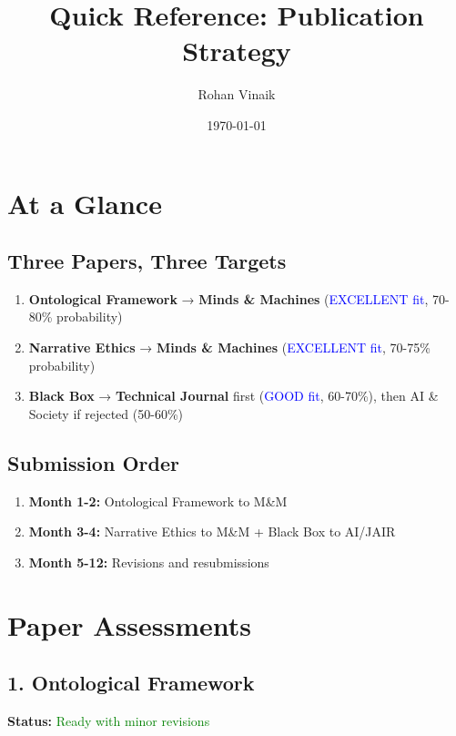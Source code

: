 \documentclass[12pt]{article}
\title{\textbf{Quick Reference: Publication Strategy}}
\author{Rohan Vinaik}
\date{\today}
\begin{document}
\maketitle

\section*{At a Glance}

\subsection*{Three Papers, Three Targets}

\begin{enumerate}[itemsep=0pt]
\item \textbf{Ontological Framework} → \textbf{Minds \& Machines} (\textcolor{blue}{EXCELLENT fit}, 70-80\% probability)
\item \textbf{Narrative Ethics} → \textbf{Minds \& Machines} (\textcolor{blue}{EXCELLENT fit}, 70-75\% probability)
\item \textbf{Black Box} → \textbf{Technical Journal} first (\textcolor{blue}{GOOD fit}, 60-70\%), then AI \& Society if rejected (50-60\%)
\end{enumerate}

\subsection*{Submission Order}

\begin{enumerate}[itemsep=0pt]
\item \textbf{Month 1-2:} Ontological Framework to M\&M
\item \textbf{Month 3-4:} Narrative Ethics to M\&M + Black Box to AI/JAIR
\item \textbf{Month 5-12:} Revisions and resubmissions
\end{enumerate}

\section*{Paper Assessments}

\subsection*{1. Ontological Framework}

\textbf{Status:} \textcolor{green}{Ready with minor revisions}
\end{document}
